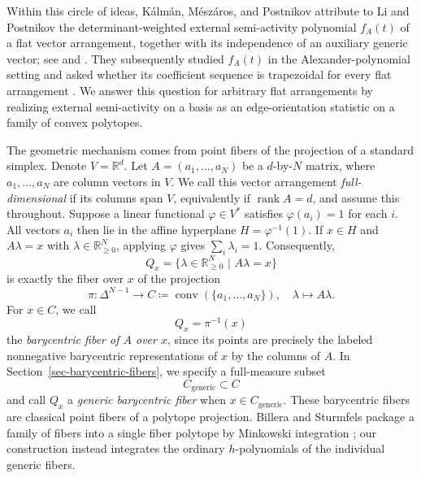\documentclass[12pt]{amsart}
\numberwithin{equation}{section}
\numberwithin{theorem}{section}
\newcommand{\op}{\operatorname}
\newcommand{\R}{\mathbb{R}}
\begin{document}
Within this circle of ideas, Kálmán, Mészáros, and Postnikov attribute to Li and Postnikov the determinant-weighted external semi-activity polynomial $f_A(t)$ of a flat vector arrangement, together with its independence of an auxiliary generic vector; see \cite{LP13} and \cite[Definition~3.3 and Theorem~3.4]{KMP}.
They subsequently studied $f_A(t)$ in the Alexander-polynomial setting and asked whether its coefficient sequence is trapezoidal for every flat arrangement \cite[p.~2]{KMP}. We answer this question for arbitrary flat arrangements by realizing external semi-activity on a basis as an edge-orientation statistic on a family of convex polytopes.

The geometric mechanism comes from point fibers of the projection of a standard simplex.
Denote $V=\R^d$. Let $A=(a_1,\dots,a_N)$ be a $d$-by-$N$ matrix, where $a_1,\dots,a_N$ are column vectors in $V$. We call this vector arrangement \emph{full-dimensional} if its columns span $V$, equivalently if $\op{rank}A=d$, and assume this throughout. Suppose a linear functional $\varphi\in V^*$ satisfies $\varphi(a_i)=1$ for each $i$. All vectors $a_i$ then lie in the affine hyperplane $H=\varphi^{-1}(1)$. If $x\in H$ and $A\lambda=x$ with $\lambda\in \R^N_{\geq0}$, applying $\varphi$ gives $\sum_i\lambda_i=1$. Consequently,
\begin{equation*}
  Q_x=\{\lambda\in \R^N_{\geq0}\,\,|\,\,A\lambda=x\}
\end{equation*}
is exactly the fiber over $x$ of the projection
\begin{equation*}
  \pi\colon \Delta^{N-1} \longrightarrow C\coloneqq \op{conv}(\{a_1,\dots,a_N\}),\quad \lambda\mapsto A\lambda.
\end{equation*}
For $x \in C$, we call
\[
  Q_x=\pi^{-1}(x)
\]
the \emph{barycentric fiber of $A$ over $x$}, since its points are
precisely the labeled nonnegative barycentric representations of $x$
by the columns of $A$.
In Section~\ref{sec-barycentric-fibers}, we specify a full-measure
subset
\[
  C_{\mathrm{generic}}\subset C
\]
and call $Q_x$ a \emph{generic barycentric fiber} when
$x\in C_{\mathrm{generic}}$.
These barycentric fibers are classical point fibers of a polytope projection. Billera and Sturmfels package a family of fibers into a single fiber polytope by Minkowski integration \cite{BS92}; our construction instead integrates the ordinary $h$-polynomials of the individual generic fibers.
\end{document}
